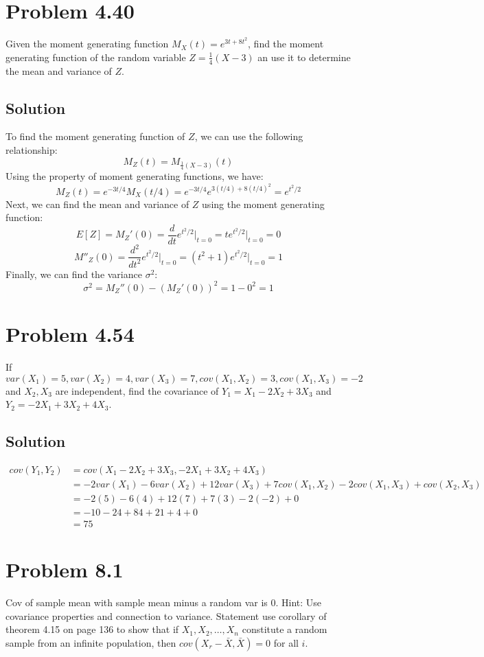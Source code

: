 \documentclass{article}
\begin{document}
\section*{Problem 4.40}
Given the moment generating function $M_X(t) = e^{3t+8t^2}$, find the moment generating function of the random variable $Z = \frac{1}{4}(X-3)$ an use it to determine the mean and variance of $Z$.
\subsection*{Solution}
To find the moment generating function of $Z$, we can use the following relationship:
$$
M_Z(t) = M_{\frac{1}{4}(X-3)}(t)
$$
Using the property of moment generating functions, we have:
$$
M_Z(t) = e^{-3t/4}M_X(t/4) = e^{-3t/4} e^{3(t/4) + 8(t/4)^2} = e^{t^2/2}
$$
Next, we can find the mean and variance of $Z$ using the moment generating function:
$$
E[Z] = M_Z'(0) = \frac{d}{dt} e^{t^2/2} \bigg|_{t=0} = te^{t^2/2} \bigg|_{t=0} = 0
$$
$$
M''_Z(0) = \frac{d^2}{dt^2} e^{t^2/2} \bigg|_{t=0} = (t^2+1)e^{t^2/2} \bigg|_{t=0} = 1
$$
Finally, we can find the variance $\sigma^2$:
$$
\sigma^2 = M_Z''(0) - (M_Z'(0))^2 = 1 - 0^2 = 1
$$

\section*{Problem 4.54}
If $var(X_1) = 5, var(X_2) = 4, var(X_3) = 7, cov(X_1, X_2) = 3, cov(X_1, X_3) = -2 $ and $X_2, X_3$ are independent, find the covariance of $Y_1 = X_1 - 2X_2 + 3X_3$ and $Y_2 = -2X_1 + 3X_2 + 4X_3$.
\subsection*{Solution}
\begin{align*}
    cov(Y_1, Y_2) &= cov(X_1 - 2X_2 + 3X_3, -2X_1 + 3X_2 + 4X_3) \\
    &= -2var(X_1) - 6var(X_2) + 12var(X_3) + 7cov(X_1, X_2) - 2cov(X_1, X_3) + cov(X_2, X_3)\\
    &= -2(5) - 6(4) + 12(7) + 7(3) - 2(-2) + 0\\
    &= -10 - 24 + 84 + 21 + 4 + 0\\
    &= 75
\end{align*}

\section*{Problem 8.1}
Cov of sample mean with sample mean minus a random var is 0. Hint: Use covariance properties and connection to variance. Statement use corollary of theorem 4.15 on page 136 to show that if $X_1, X_2, \ldots, X_n$ constitute a random sample from an infinite population, then $cov(X_r-\bar{X}, \bar{X}) = 0$ for all $i$.
\end{document}
